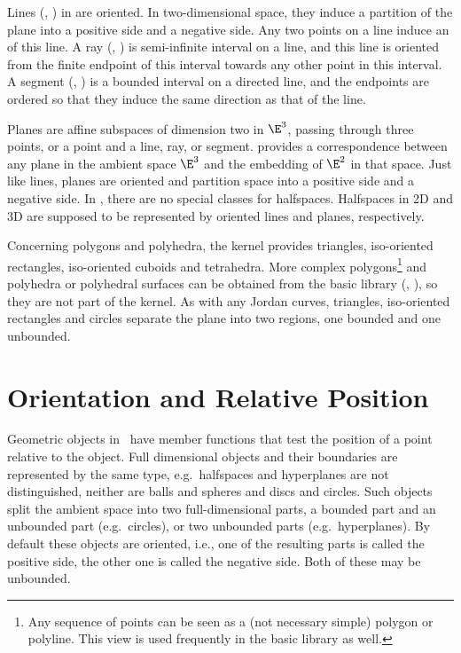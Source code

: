 Lines  (, ) in {\cgal} are oriented. In 
two-dimensional space, they induce a partition of the plane
into a positive side and a negative side. 
Any two points on a line induce an 
of this line. 
A ray (, ) is semi-infinite interval on a line, 
and this line is oriented from the finite endpoint of this interval towards 
any other point in this interval. A segment (, 
) is a bounded interval on a directed line,
and the endpoints are ordered so that they induce the same direction 
as that of the line.  

Planes are affine subspaces of dimension two in $\E^3$, passing through 
three points, or a point and a line, ray, or segment. 
{\cgal} provides a correspondence between any plane in the ambient 
space $\E^3$ and the embedding of $\E^2$ in that space.
Just like lines, planes are oriented and partition space into a positive side 
and a negative side.
In \cgal, there are no special classes for halfspaces. Halfspaces in 2D and
3D are supposed to be represented by oriented lines and planes, respectively.

Concerning polygons and polyhedra, the kernel provides triangles,
iso-oriented rectangles, iso-oriented cuboids and tetrahedra. 
More complex polygons\footnote{Any sequence of points can be seen as
a (not necessary simple) polygon or polyline. This view is used 
frequently in the basic library as well.}
and polyhedra or polyhedral surfaces can be obtained 
from the basic library (, ), 
so they are not part of the kernel. 
As with any Jordan curves, triangles, iso-oriented rectangles and circles
separate the plane into two regions, one bounded and one unbounded.  

\section{Orientation and Relative Position}
Geometric objects in \cgal\ have member functions that test the
position of a point relative to the object.  Full dimensional objects
and their boundaries are represented by the same type, 
e.g.\ halfspaces and hyperplanes are not distinguished, neither are balls and
spheres and discs and circles. Such objects split the ambient space into two
full-dimensional parts, a bounded part and an unbounded part 
(e.g.\ circles), or two unbounded parts (e.g.\ hyperplanes). By default these
objects are oriented, i.e., one of the resulting parts is called the
positive side, the other one is called the negative side. Both of
these may be unbounded.

